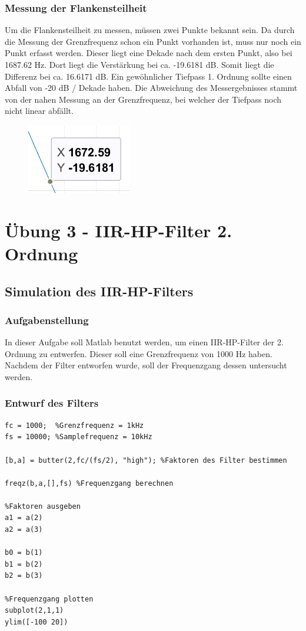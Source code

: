 \documentclass{article}
\begin{document}
\subsubsection{Messung der Flankensteilheit}
Um die Flankensteilheit zu messen, müssen zwei Punkte bekannt sein. Da durch die Messung der Grenzfrequenz schon ein Punkt vorhanden ist, muss nur noch ein Punkt erfasst werden. Dieser liegt eine Dekade nach dem ersten Punkt, also bei 1687.62 Hz. Dort liegt die Verstärkung bei ca. -19.6181 dB. Somit liegt die Differenz bei ca. 16.6171 dB. Ein gewöhnlicher Tiefpass 1. Ordnung sollte einen Abfall von -20 dB / Dekade haben. Die Abweichung des Messergebnisses stammt von der nahen Messung an der Grenzfrequenz, bei welcher der Tiefpass noch nicht linear abfällt.
\begin{figure}[h]
    \includegraphics[width=0.25\linewidth]{img/Bode_Mess_02.png}
\end{figure}

\newpage
\section{Übung 3 - IIR-HP-Filter 2. Ordnung}
\subsection{Simulation des IIR-HP-Filters}
\subsubsection{Aufgabenstellung}
In dieser Aufgabe soll Matlab benutzt werden, um einen IIR-HP-Filter der 2. Ordnung zu entwerfen. Dieser soll eine Grenzfrequenz von 1000 Hz haben. Nachdem der Filter entworfen wurde, soll der Frequenzgang dessen untersucht werden.

\subsubsection{Entwurf des Filters}
\begin{verbatim}
fc = 1000;  %Grenzfrequenz = 1kHz
fs = 10000; %Samplefrequenz = 10kHz

[b,a] = butter(2,fc/(fs/2), "high"); %Faktoren des Filter bestimmen

freqz(b,a,[],fs) %Frequenzgang berechnen

%Faktoren ausgeben
a1 = a(2)
a2 = a(3)

b0 = b(1)
b1 = b(2)
b2 = b(3)

%Frequenzgang plotten
subplot(2,1,1)
ylim([-100 20])
\end{verbatim}
\end{document}
